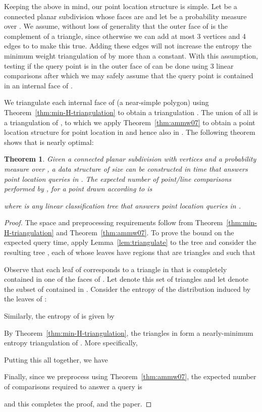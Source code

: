 \documentclass[lotsofwhite]{patmorin}
\newtheorem{thm}{Theorem}{\bfseries}{\itshape}
\newcommand{\thmref}[1]{Theorem~\ref{thm:#1}}
\newcommand{\lemref}[1]{Lemma~\ref{lem:#1}}
\begin{document}
Keeping the above in mind, our point location structure is simple.
Let  be a connected planar subdivision whose faces are
 and let  be a probability measure over
.  We assume, without loss of generality that the outer face of
 is the complement of a triangle, since otherwise we can add at
most 3 vertices and 4 edges to  to make this true.  Adding these
edges will not increase the entropy the minimum weight triangulation
of  by more than a constant.  With this assumption, testing if the
query point is in the outer face of  can be done using 3 linear
comparisons after which we may safely assume that the query point is
contained in an internal face of .

We triangulate each internal face  of  (a near-simple polygon)
using \thmref{min-H-triangulation} to obtain a triangulation
. The union of all 
is a triangulation  of , to which we apply
\thmref{ammw07} to obtain a point location structure  for
point location in  and hence also in .  The following
theorem shows that  is nearly optimal:

\begin{thm}
Given a connected planar subdivision  with  vertices and a probability
measure  over , a data structure  of size  can be
constructed in  time that answers point location queries in .
The expected number of point/line comparisons performed by , 
for a point  drawn according to  is 
 
where  is any linear classification tree that answers point
location queries in .
\end{thm}

\begin{proof}
The space and preprocessing requirements follow from
\thmref{min-H-triangulation} and \thmref{ammw07}.
To prove the bound on the expected query time, apply
\lemref{triangulate} to the tree  and consider the resulting tree
, each of whose leaves have regions that are triangles and such
that

Observe that each leaf of  corresponds to a triangle in 
that is completely contained in one of the faces of .  Let
 denote this set of triangles and let  denote the
subset of  contained in .
Consider the entropy  of the distribution induced by the
leaves of :

Similarly, the entropy of  is given by 

By \thmref{min-H-triangulation}, the triangles in  form a
nearly-minimum entropy triangulation of .  More specifically, 

Putting this all together, we have

Finally, since we preprocess  using \thmref{ammw07}, the
expected number of comparisons required to answer a query is

and this completes the proof, and the paper.
\end{proof}



\end{document}
